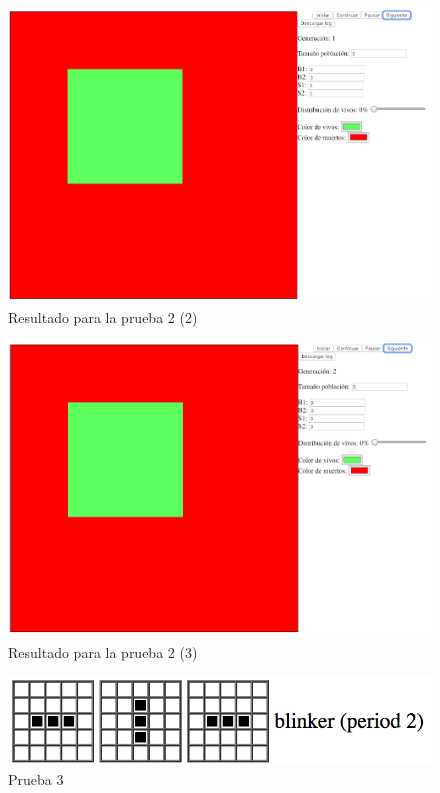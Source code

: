 	\begin{figure}[H]
		\begin{center}
			\includegraphics[scale=.3]{GOL/img/test2-2.png}
			\caption{Resultado para la prueba 2 (2)}
			\label{fig:gol4}
		\end{center}
	\end{figure}

	\begin{figure}[H]
		\begin{center}
			\includegraphics[scale=.3]{GOL/img/test2-3.png}
			\caption{Resultado para la prueba 2 (3)}
			\label{fig:gol5}
		\end{center}
	\end{figure}

	\begin{figure}[H]
		\begin{center}
			\includegraphics[scale=.5]{GOL/img/3.png}
			\caption{Prueba 3}
			\label{fig:gol4}
		\end{center}
	\end{figure}

